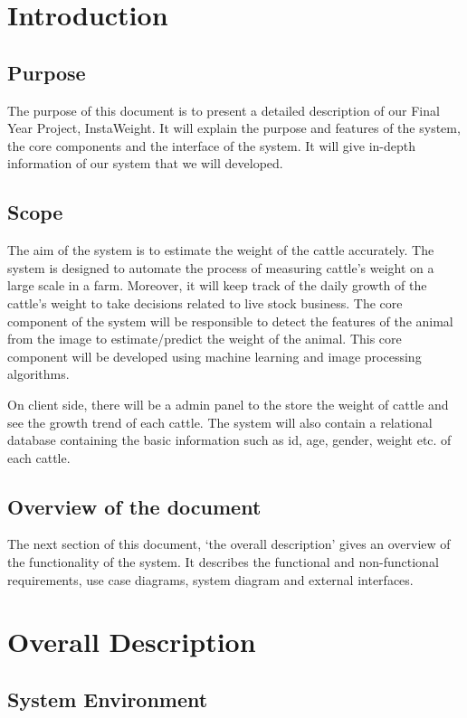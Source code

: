 \section{Introduction}
\subsection{Purpose}

The purpose of this document is to present a detailed description of our Final Year Project, InstaWeight. It will explain the purpose and features of the system, the core components and the interface of the system. It will give in-depth information of our system that we will developed. 

\subsection{Scope}
The aim of the system is to estimate the weight of the cattle accurately. The system is designed to automate the process of measuring cattle’s weight on a large scale in a farm. Moreover, it will keep track of the daily growth of the cattle’s weight to take decisions related to live stock business. The core component of the system will be responsible to detect the features of the animal from the image to estimate/predict the weight of the animal. This core component will be developed using machine learning and image processing algorithms. 

\vspace*{2mm} On client side, there will be a admin panel to the store the weight of cattle and see the growth trend of each cattle. The system will also contain a relational database containing the basic information such as id, age, gender, weight etc. of each cattle. 

\subsection{Overview of the document}
The next section of this document, ‘the overall description’ gives an overview of the functionality of the system. It describes the functional and non-functional requirements, use case diagrams, system diagram and external interfaces. 

\section{Overall Description}

\subsection{System Environment}

